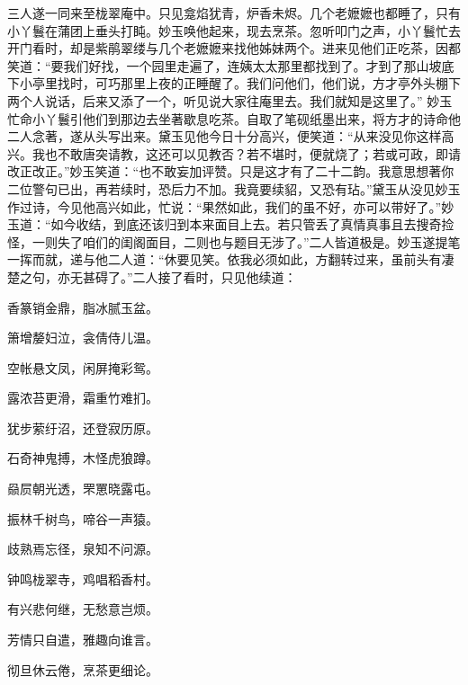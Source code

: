 \begin{parag}
    三人遂一同来至栊翠庵中。只见龛焰犹青，炉香未烬。几个老嬷嬷也都睡了，只有小丫鬟在蒲团上垂头打盹。妙玉唤他起来，现去烹茶。忽听叩门之声，小丫鬟忙去开门看时，却是紫鹃翠缕与几个老嬷嬷来找他姊妹两个。进来见他们正吃茶，因都笑道：“要我们好找，一个园里走遍了，连姨太太那里都找到了。才到了那山坡底下小亭里找时，可巧那里上夜的正睡醒了。我们问他们，他们说，方才亭外头棚下两个人说话，后来又添了一个，听见说大家往庵里去。我们就知是这里了。” 妙玉忙命小丫鬟引他们到那边去坐著歇息吃茶。自取了笔砚纸墨出来，将方才的诗命他二人念著，遂从头写出来。黛玉见他今日十分高兴，便笑道：“从来没见你这样高兴。我也不敢唐突请教，这还可以见教否？若不堪时，便就烧了；若或可政，即请改正改正。”妙玉笑道：“也不敢妄加评赞。只是这才有了二十二韵。我意思想著你二位警句已出，再若续时，恐后力不加。我竟要续貂，又恐有玷。”黛玉从没见妙玉作过诗，今见他高兴如此，忙说：“果然如此，我们的虽不好，亦可以带好了。”妙玉道：“如今收结，到底还该归到本来面目上去。若只管丢了真情真事且去搜奇捡怪，一则失了咱们的闺阁面目，二则也与题目无涉了。”二人皆道极是。妙玉遂提笔一挥而就，递与他二人道：“休要见笑。依我必须如此，方翻转过来，虽前头有凄楚之句，亦无甚碍了。”二人接了看时，只见他续道：
\end{parag}


\begin{poem}
    \begin{pl}
        香篆销金鼎，脂冰腻玉盆。
    \end{pl}
    \begin{pl}
        箫增嫠妇泣，衾倩侍儿温。
    \end{pl}
    \begin{pl}
        空帐悬文凤，闲屏掩彩鸳。
    \end{pl}
    \begin{pl}
        露浓苔更滑，霜重竹难扪。
    \end{pl}
    \begin{pl}
        犹步萦纡沼，还登寂历原。
    \end{pl}
    \begin{pl}
        石奇神鬼搏，木怪虎狼蹲。
    \end{pl}
    \begin{pl}
        赑屃朝光透，罘罳晓露屯。
    \end{pl}
    \begin{pl}
        振林千树鸟，啼谷一声猿。
    \end{pl}
    \begin{pl}
        歧熟焉忘径，泉知不问源。
    \end{pl}
    \begin{pl}
        钟鸣栊翠寺，鸡唱稻香村。
    \end{pl}
    \begin{pl}
        有兴悲何继，无愁意岂烦。
    \end{pl}
    \begin{pl}
        芳情只自遣，雅趣向谁言。
    \end{pl}
    \begin{pl}
        彻旦休云倦，烹茶更细论。
    \end{pl}

\end{poem}


